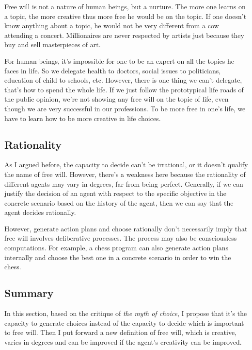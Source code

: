 Free will is not a nature of human beings, but a nurture. The more one learns on a topic, the more creative thus more free he would be on the topic. If one doesn't know anything about a topic, he would not be very different from a cow attending a concert. Millionaires are never respected by artists just because they buy and sell masterpieces of art.

For human beings, it's impossible for one to be an expert on all the topics he faces in life. So we delegate health to doctors, social issues to politicians, education of child to schools, etc. However, there is one thing we can't delegate, that's how to spend the whole life. If we just follow the prototypical life roads of the public opinion, we're not showing any free will on the topic of life, even though we are very successful in our professions. To be more free in one's life, we have to learn how to be more creative in life choices.

\subsection{Rationality}

As I argued before, the capacity to decide can't be irrational, or it doesn't qualify the name of free will. However, there’s a weakness here because the rationality of different agents may vary in degrees, far from being perfect. Generally, if we can justify the decision of an agent with respect to the specific objective in the concrete scenario based on the history of the agent, then we can say that the agent decides rationally.

However, generate action plans and choose rationally don’t necessarily imply that free will involves deliberative processes. The process may also be consciousless computations. For example, a chess program can also generate action plans internally and choose the best one in a concrete scenario in order to win the chess.

\subsection{Summary}

In this section, based on the critique of \emph{the myth of choice}, I propose that it's the capacity to generate choices instead of the capacity to decide which is important to free will. Then I put forward a new definition of free will, which is creative, varies in degrees and can be improved if the agent's creativity can be improved.

